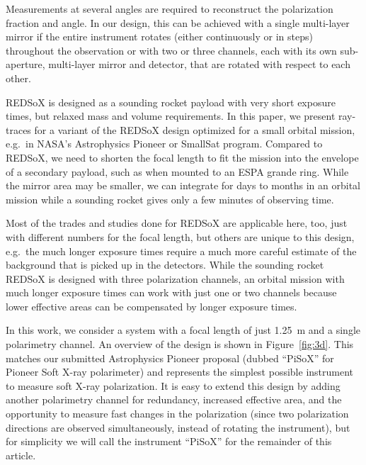 \documentclass[]{spie}  %
\begin{document}
Measurements at several angles are required to reconstruct the
polarization fraction and angle. In our design, this can be achieved
with a single multi-layer mirror if the entire instrument rotates
(either continuously or in steps) throughout the observation or with
two or three channels, each with its own sub-aperture, multi-layer
mirror and detector, that are rotated with respect to each other.

REDSoX is designed as a sounding rocket payload with very short
exposure times, but relaxed mass and volume requirements. In this paper,
we present ray-traces for a variant of the REDSoX design optimized for
a small orbital mission, e.g.\ in NASA's Astrophysics Pioneer or
SmallSat program. Compared to REDSoX, we need to shorten the focal
length to fit the mission into the envelope of a secondary payload,
such as when mounted to an ESPA grande ring.
While the mirror area may be smaller, we can integrate for
days to months in an orbital
mission while a sounding rocket gives only a few minutes of observing
time.

Most of the trades and studies done for REDSoX\cite{redsoxtrace} are
applicable here, too, just with different numbers for the focal
length, but others are unique to this design, e.g.\ the much longer
exposure times require a much more careful estimate of the background
that is picked up in the detectors.  While the sounding rocket REDSoX
is designed with three polarization channels, an orbital mission with
much longer exposure times can work with just one or two channels
because lower effective areas can be compensated by longer exposure
times.

In this work, we consider a system with a focal length of just 1.25~m
and a single polarimetry channel. An overview of the design is shown
in Figure~\ref{fig:3d}. This matches our submitted Astrophysics
Pioneer proposal (dubbed ``PiSoX'' for Pioneer Soft X-ray
polarimeter) and represents the simplest possible instrument to
measure soft X-ray polarization. It is easy to extend this design by
adding another polarimetry channel for redundancy, increased effective
area, and the opportunity to measure fast changes in the polarization
(since two polarization directions are observed simultaneously,
instead of rotating the instrument), but for simplicity we will call
the instrument ``PiSoX'' for the remainder of this article.
\end{document}
